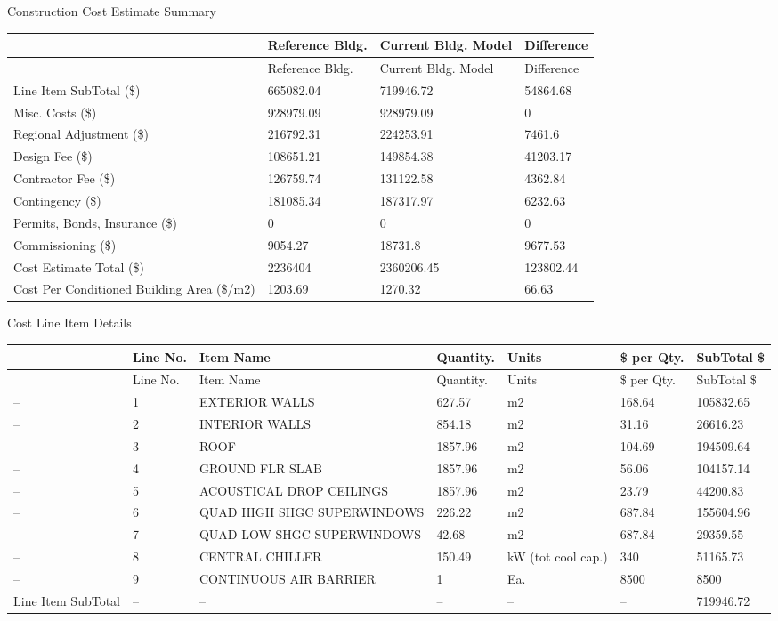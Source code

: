 Construction Cost Estimate Summary

\begin{longtable}[c]{>{\raggedright}p{1.5in}>{\raggedright}p{1.5in}>{\raggedright}p{1.5in}>{\raggedright}p{1.5in}}
\toprule 
 & Reference Bldg. & Current Bldg. Model & Difference \tabularnewline
\midrule
\endfirsthead

\toprule 
 & Reference Bldg. & Current Bldg. Model & Difference \tabularnewline
\midrule
\endhead

Line Item SubTotal (\$) & 665082.04 & 719946.72 & 54864.68 \tabularnewline
Misc. Costs (\$) & 928979.09 & 928979.09 & 0 \tabularnewline
Regional Adjustment (\$) & 216792.31 & 224253.91 & 7461.6 \tabularnewline
Design Fee (\$) & 108651.21 & 149854.38 & 41203.17 \tabularnewline
Contractor Fee (\$) & 126759.74 & 131122.58 & 4362.84 \tabularnewline
Contingency (\$) & 181085.34 & 187317.97 & 6232.63 \tabularnewline
Permits, Bonds, Insurance (\$) & 0 & 0 & 0 \tabularnewline
Commissioning (\$) & 9054.27 & 18731.8 & 9677.53 \tabularnewline
Cost Estimate Total (\$) & 2236404 & 2360206.45 & 123802.44 \tabularnewline
Cost Per Conditioned Building Area (\$/m2) & 1203.69 & 1270.32 & 66.63 \tabularnewline
\bottomrule
\end{longtable}

Cost Line Item Details

\begin{longtable}[c]{>{\raggedright}p{0.85in}>{\raggedright}p{0.85in}>{\raggedright}p{0.85in}>{\raggedright}p{0.85in}>{\raggedright}p{0.85in}>{\raggedright}p{0.85in}>{\raggedright}p{0.85in}}
\toprule 
 & Line No. & Item Name & Quantity. & Units & \$ per Qty. & SubTotal \$ \tabularnewline
\midrule
\endfirsthead

\toprule 
 & Line No. & Item Name & Quantity. & Units & \$ per Qty. & SubTotal \$ \tabularnewline
\midrule
\endhead

-- & 1 & EXTERIOR WALLS & 627.57 & m2 & 168.64 & 105832.65 \tabularnewline
-- & 2 & INTERIOR WALLS & 854.18 & m2 & 31.16 & 26616.23 \tabularnewline
-- & 3 & ROOF & 1857.96 & m2 & 104.69 & 194509.64 \tabularnewline
-- & 4 & GROUND FLR SLAB & 1857.96 & m2 & 56.06 & 104157.14 \tabularnewline
-- & 5 & ACOUSTICAL DROP CEILINGS & 1857.96 & m2 & 23.79 & 44200.83 \tabularnewline
-- & 6 & QUAD HIGH SHGC SUPERWINDOWS & 226.22 & m2 & 687.84 & 155604.96 \tabularnewline
-- & 7 & QUAD LOW SHGC SUPERWINDOWS & 42.68 & m2 & 687.84 & 29359.55 \tabularnewline
-- & 8 & CENTRAL CHILLER & 150.49 & kW (tot cool cap.) & 340 & 51165.73 \tabularnewline
-- & 9 & CONTINUOUS AIR BARRIER & 1 & Ea. & 8500 & 8500 \tabularnewline
Line Item SubTotal & -- & -- & -- & -- & -- & 719946.72 \tabularnewline
\bottomrule
\end{longtable}

